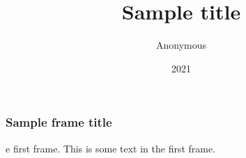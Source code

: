 \documentclass{article}
\title{Sample title}
\author{Anonymous}
\institute{Overleaf}
\date{2021}
\begin{document}
\frame{\titlepage}

\begin{frame}
\frametitle{Sample frame title}e first frame. This is some text in the first frame.
\end{frame}
\end{document}

